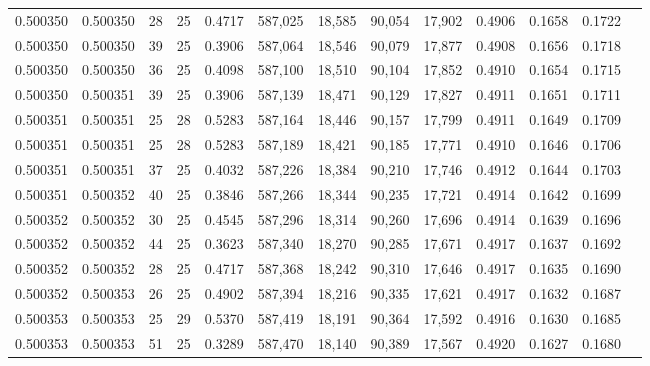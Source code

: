 \begin{tabular}{rrrrrrrrrrrrr}
0.500350 & 0.500350 &    28 &  25 &                                     0.4717 & 587,025 &  18,585 &  90,054 &  17,902 & 0.4906 & 0.1658 & 0.1722 \\
0.500350 & 0.500350 &    39 &  25 &                                     0.3906 & 587,064 &  18,546 &  90,079 &  17,877 & 0.4908 & 0.1656 & 0.1718 \\
0.500350 & 0.500350 &    36 &  25 &                                     0.4098 & 587,100 &  18,510 &  90,104 &  17,852 & 0.4910 & 0.1654 & 0.1715 \\
0.500350 & 0.500351 &    39 &  25 &                                     0.3906 & 587,139 &  18,471 &  90,129 &  17,827 & 0.4911 & 0.1651 & 0.1711 \\
0.500351 & 0.500351 &    25 &  28 &                                     0.5283 & 587,164 &  18,446 &  90,157 &  17,799 & 0.4911 & 0.1649 & 0.1709 \\
0.500351 & 0.500351 &    25 &  28 &                                     0.5283 & 587,189 &  18,421 &  90,185 &  17,771 & 0.4910 & 0.1646 & 0.1706 \\
0.500351 & 0.500351 &    37 &  25 &                                     0.4032 & 587,226 &  18,384 &  90,210 &  17,746 & 0.4912 & 0.1644 & 0.1703 \\
0.500351 & 0.500352 &    40 &  25 &                                     0.3846 & 587,266 &  18,344 &  90,235 &  17,721 & 0.4914 & 0.1642 & 0.1699 \\
0.500352 & 0.500352 &    30 &  25 &                                     0.4545 & 587,296 &  18,314 &  90,260 &  17,696 & 0.4914 & 0.1639 & 0.1696 \\
0.500352 & 0.500352 &    44 &  25 &                                     0.3623 & 587,340 &  18,270 &  90,285 &  17,671 & 0.4917 & 0.1637 & 0.1692 \\
0.500352 & 0.500352 &    28 &  25 &                                     0.4717 & 587,368 &  18,242 &  90,310 &  17,646 & 0.4917 & 0.1635 & 0.1690 \\
0.500352 & 0.500353 &    26 &  25 &                                     0.4902 & 587,394 &  18,216 &  90,335 &  17,621 & 0.4917 & 0.1632 & 0.1687 \\
0.500353 & 0.500353 &    25 &  29 &                                     0.5370 & 587,419 &  18,191 &  90,364 &  17,592 & 0.4916 & 0.1630 & 0.1685 \\
0.500353 & 0.500353 &    51 &  25 &                                     0.3289 & 587,470 &  18,140 &  90,389 &  17,567 & 0.4920 & 0.1627 & 0.1680 \\

\end{tabular}
